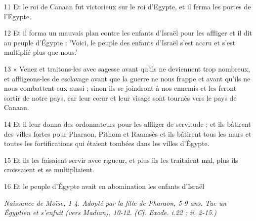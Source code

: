 \par 11 Et le roi de Canaan fut victorieux sur le roi d'Egypte, et il ferma les portes de l'Egypte.
\par 12 Et il forma un mauvais plan contre les enfants d'Israël pour les affliger et il dit au peuple d'Égypte : 'Voici, le peuple des enfants d'Israël s'est accru et s'est multiplié plus que nous.'
\par 13 « Venez et traitons-les avec sagesse avant qu'ils ne deviennent trop nombreux, et affligeons-les de esclavage avant que la guerre ne nous frappe et avant qu'ils ne nous combattent eux aussi ; sinon ils se joindront à nos ennemis et les feront sortir de notre pays, car leur cœur et leur visage sont tournés vers le pays de Canaan.
\par 14 Et il leur donna des ordonnateurs pour les affliger de servitude ; et ils bâtirent des villes fortes pour Pharaon, Pithom et Raamsès et ils bâtirent tous les murs et toutes les fortifications qui étaient tombées dans les villes d'Égypte.
\par 15 Et ils les faisaient servir avec rigueur, et plus ils les traitaient mal, plus ils croissaient et se multipliaient.
\par 16 Et le peuple d'Égypte avait en abomination les enfants d'Israël


\par \textit{Naissance de Moïse, 1-4. Adopté par la fille de Pharaon, 5-9 ans. Tue un Égyptien et s'enfuit (vers Madian), 10-12. (Cf. Exode. i.22 ; ii. 2-15.)}

